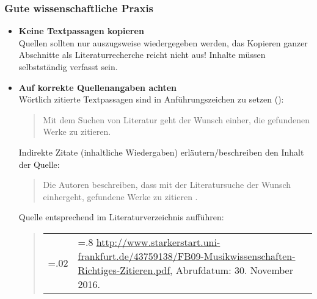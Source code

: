 \subsubsection*{Gute wissenschaftliche Praxis}
\begin{itemize}
\item \textbf{Keine Textpassagen kopieren} \\
Quellen sollten nur auszugsweise wiedergegeben werden, das Kopieren ganzer Abschnitte als Literaturrecherche reicht nicht aus! Inhalte müssen selbstständig verfasst sein.
\item \textbf{Auf korrekte Quellenangaben achten} \\
Wörtlich zitierte Textpassagen sind in Anführungszeichen zu setzen (\glqq\grqq):
\begin{quote}
\glqq Mit dem Suchen von Literatur geht der Wunsch einher, die gefundenen Werke zu zitieren.\grqq\ \cite{cite}
\end{quote}
Indirekte Zitate (inhaltliche Wiedergaben) erläutern/beschreiben den Inhalt der Quelle:
\begin{quote}
Die Autoren beschreiben, dass mit der Literatursuche der Wunsch einhergeht, gefundene Werke zu zitieren \cite{cite}.
\end{quote}
Quelle entsprechend im Literaturverzeichnis aufführen:
\begin{quote}
\begin{tabularx}{\textwidth}{>{\hsize=.02\hsize}X>{\hsize=.8\hsize}X}
[1] & \url{http://www.starkerstart.uni-frankfurt.de/43759138/FB09-Musikwissenschaften-Richtiges-Zitieren.pdf}, Abrufdatum: 30. November 2016.
\end{tabularx}
\end{quote}
\end{itemize}